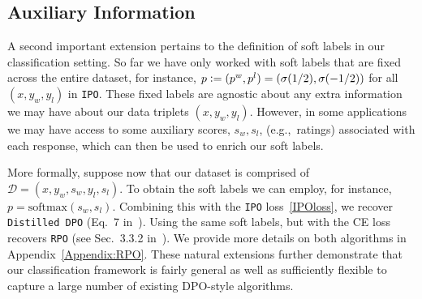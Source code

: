 \subsection{Auxiliary Information}
\label{subsec:auxiliary}

A second important extension pertains to the definition of soft labels in our classification setting. So far we have only worked with soft labels that are fixed across the entire dataset, for instance, $p \mathrel{\mathop:}= (p^{w}, p^{l}) = (\sigma(1/2) , \sigma(-1/2))$ for all $(x, y_w, y_l)$ in \texttt{IPO}. These fixed labels are agnostic about any extra information we may have about our data triplets $(x , y_w , y_l)$. However, in some applications we may have access to some auxiliary scores, $s_w,s_l$, (e.g.,~ratings) associated with each response, which can then be used to enrich our soft labels. 

More formally, suppose now that our dataset is comprised of ${\mathcal D} = (x,y_w, s_w, y_l, s_l)$. To obtain the soft labels we can employ, for instance, $p = \text{softmax}(s_w, s_l)$. Combining this with the \texttt{IPO} loss~\eqref{IPOloss}, we recover \texttt{Distilled DPO} (Eq.~7 in~\citealt{distilled_DPO}). Using the same soft labels, but with the CE loss recovers \texttt{RPO} (see Sec.~3.3.2 in~\citealt{nemotron}). We provide more details on both algorithms in Appendix~\ref{Appendix:RPO}. These natural extensions further demonstrate that our classification framework is fairly general as well as sufficiently flexible to capture a large number of existing DPO-style algorithms.